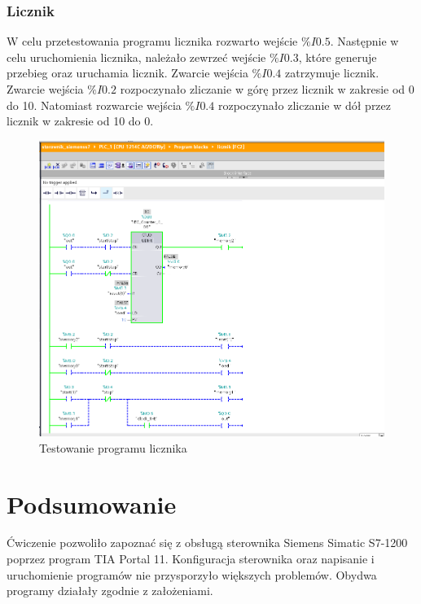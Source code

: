 \documentclass[12pt]{article}
\begin{document}
\subsubsection{Licznik}
W celu przetestowania programu licznika rozwarto wejście $\%I0.5$. Następnie w celu uruchomienia licznika, należało zewrzeć wejście $\%I0.3$, które generuje przebieg oraz uruchamia licznik. Zwarcie wejścia $\%I0.4$ zatrzymuje licznik. Zwarcie wejścia $\%I0.2$ rozpoczynało zliczanie w górę przez licznik w zakresie od 0 do 10. Natomiast rozwarcie wejścia $\%I0.4$ rozpoczynało zliczanie w dół przez licznik w zakresie od 10 do 0.
\begin{figure}[H]
    \centering
    \includegraphics[width=\textwidth]{./zdj/licznik_test.png}
    \caption{Testowanie programu licznika}
    \label{licznik_test}
\end{figure} 




\section{Podsumowanie}
Ćwiczenie pozwoliło zapoznać się z obsługą sterownika Siemens Simatic S7-1200 poprzez program TIA Portal 11. Konfiguracja sterownika oraz napisanie i uruchomienie programów nie przysporzyło większych problemów. Obydwa programy działały zgodnie z założeniami.
\end{document}
